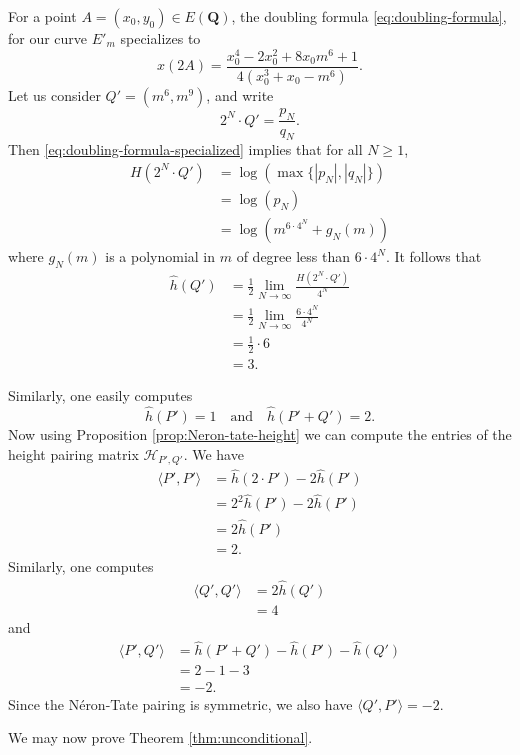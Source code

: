 \documentclass{amsart}
\numberwithin{equation}{section}
\theoremstyle{remark}
\newcommand{\Q}{\mathbf{Q}}
\begin{document}
For a point $A=(x_0,y_0) \in E(\Q)$, the doubling formula \eqref{eq:doubling-formula}, for our curve $E'_m$ specializes to
\begin{equation}\label{eq:doubling-formula-specialized}
x(2A) = \frac{x_0^4 - 2x_0^2 + 8x_0m^6 + 1}{4(x_0^3+x_0-m^6)}.
\end{equation}
Let us consider $Q'=(m^6,m^9)$, and write
\[
2^N \cdot Q' = \frac{p_N}{q_N}.
\]
Then \eqref{eq:doubling-formula-specialized} implies that for all $N \geq 1$,
\begin{align*}
H(2^N \cdot Q') &= \log (\max\{|p_N|,|q_N|\}) \\
&= \log(p_N)\\
&= \log\left( m^{6 \cdot 4^N} + g_N (m) \right)
\end{align*}
where $g_N(m)$ is a polynomial in $m$ of degree less than $6 \cdot 4^N$. It follows that
\begin{align*}
\hat{h}(Q') &=  \frac{1}{2} \lim_{N \to \infty} \frac{H(2^N \cdot Q')}{4^N} \\
&=\frac{1}{2} \lim_{N \to \infty} \frac{6 \cdot 4^N}{4^N} \\
&=\frac{1}{2} \cdot 6\\
&=3.
\end{align*}


Similarly, one easily computes \[
\hat{h}(P')=1 \quad \text{and} \quad \hat{h}(P'+Q')=2.
\]
Now using Proposition \ref{prop:Neron-tate-height} we can compute the entries of the height pairing matrix $\mathcal{H}_{P',Q'}$. We have
\begin{align*}
\langle P',P' \rangle &= \hat{h}(2\cdot P') - 2 \hat{h}(P') \\
&=2^2 \hat{h}(P') - 2 \hat{h}(P')\\
&=2\hat{h}(P')\\
&=2.
\end{align*}
Similarly, one computes
\begin{align*}
\langle Q', Q' \rangle &= 2 \hat{h}(Q') \\
&=4
\end{align*}
and
\begin{align*}
\langle P',Q' \rangle &= \hat{h}(P'+Q') - \hat{h}(P') - \hat{h}(Q')\\ &=2-1-3\\ &= -2.
\end{align*}
Since the N\'{e}ron-Tate pairing is symmetric, we also have $\langle Q', P' \rangle=-2.$

We may now prove Theorem \ref{thm:unconditional}.
\end{document}
